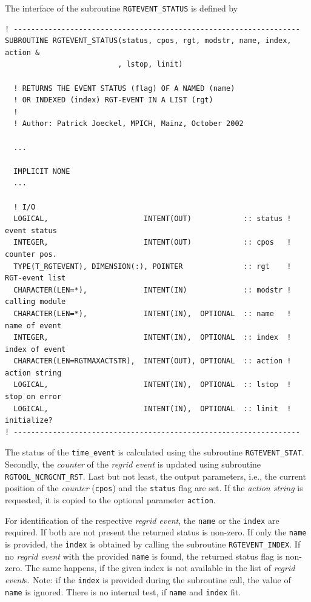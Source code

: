 \documentclass[11pt,twoside]{report}
\begin{document}
The interface of the subroutine \verb|RGTEVENT_STATUS|  is defined by
\begin{verbatim}
! ------------------------------------------------------------------
SUBROUTINE RGTEVENT_STATUS(status, cpos, rgt, modstr, name, index, action &
                          , lstop, linit)

  ! RETURNS THE EVENT STATUS (flag) OF A NAMED (name)
  ! OR INDEXED (index) RGT-EVENT IN A LIST (rgt)
  !
  ! Author: Patrick Joeckel, MPICH, Mainz, October 2002

  ...

  IMPLICIT NONE
  ...

  ! I/O
  LOGICAL,                      INTENT(OUT)            :: status ! event status
  INTEGER,                      INTENT(OUT)            :: cpos   ! counter pos. 
  TYPE(T_RGTEVENT), DIMENSION(:), POINTER              :: rgt    ! RGT-event list
  CHARACTER(LEN=*),             INTENT(IN)             :: modstr ! calling module
  CHARACTER(LEN=*),             INTENT(IN),  OPTIONAL  :: name   ! name of event
  INTEGER,                      INTENT(IN),  OPTIONAL  :: index  ! index of event
  CHARACTER(LEN=RGTMAXACTSTR),  INTENT(OUT), OPTIONAL  :: action ! action string
  LOGICAL,                      INTENT(IN),  OPTIONAL  :: lstop  ! stop on error
  LOGICAL,                      INTENT(IN),  OPTIONAL  :: linit  ! initialize?
! ------------------------------------------------------------------
\end{verbatim}
The status of the \verb|time_event| is calculated using the
subroutine \verb|RGTEVENT_STAT|. Secondly, the {\it counter} of the
{\it regrid event}  is updated using subroutine \verb|RGTOOL_NCRGCNT_RST|.
Last but not least, the output parameters, i.e., the current position
of the {\it counter} (\verb|cpos|) and the \verb|status| flag are
set. If the {\it action string} is 
requested, it is copied to the optional parameter \verb|action|.

For identification of the respective {\it regrid event},
the \verb|name| or the  \verb|index| are required. If both are not
present the returned status is non-zero. If only the \verb|name| is
provided, the \verb|index| is obtained by calling the 
subroutine \verb|RGTEVENT_INDEX|. If no {\it regrid event} with the
provided \verb|name| 
is found, the returned status flag is non-zero. The same happens, if the given
index is not available in the list of  {\it regrid event}s. 
Note: if the \verb|index| is provided during the subroutine call, the
value of   
\verb|name| is ignored. There is no internal test, if \verb|name|
and  \verb|index| fit.
 
\end{document}
